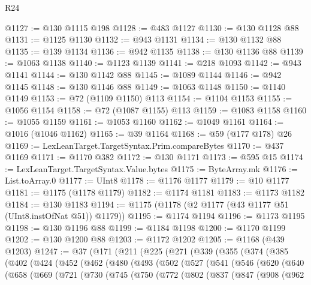 \begin{lexlean}{R24}
\begin{coremodule}
@1127 := @130 @1115 @198
@1128 := @483 @1127
@1130 := @130 @1128 @88
@1131 := @1125 @1130
@1132 := @943 @1131
@1134 := @130 @1132 @88
@1135 := @139 @1134
@1136 := @942 @1135
@1138 := @130 @1136 @88
@1139 := @1063 @1138
@1140 := @1123 @1139
@1141 := @218 @1093
@1142 := @943 @1141
@1144 := @130 @1142 @88
@1145 := @1089 @1144
@1146 := @942 @1145
@1148 := @130 @1146 @88
@1149 := @1063 @1148
@1150 := @1140 @1149
@1153 := @72 (@1109 @1150) @113
@1154 := @1104 @1153
@1155 := @1056 @1154
@1158 := @72 (@1087 @1155) @113
@1159 := @1083 @1158
@1160 := @1055 @1159
@1161 := @1053 @1160
@1162 := @1049 @1161
@1164 := @1016 (@1046 @1162)
@1165 := @39 @1164
@1168 := @59 (@177 @178) @26
@1169 := LexLeanTarget.TargetSyntax.Prim.compareBytes
@1170 := @437 @1169
@1171 := @1170 @382
@1172 := @130 @1171
@1173 := @595 @15
@1174 := LexLeanTarget.TargetSyntax.Value.bytes
@1175 := ByteArray.mk
@1176 := List.toArray.{0}
@1177 := UInt8
@1178 := @1176 @1177
@1179 := @10 @1177
@1181 := @1175 (@1178 @1179)
@1182 := @1174 @1181
@1183 := @1173 @1182
@1184 := @130 @1183
@1194 := @1175 (@1178 (@2 @1177 (@43 @1177 @51 (UInt8.instOfNat @51)) @1179))
@1195 := @1174 @1194
@1196 := @1173 @1195
@1198 := @130 @1196 @88
@1199 := @1184 @1198
@1200 := @1170 @1199
@1202 := @130 @1200 @88
@1203 := @1172 @1202
@1205 := @1168 (@439 @1203)
@1247 := @37
    (@171
      (@211
        (@225
          (@271
            (@339
              (@355
                (@374
                  (@385
                    (@402
                      (@424
                        (@452
                          (@462
                            (@480
                              (@493
                                (@502
                                  (@527
                                    (@541
                                      (@546
                                        (@620
                                          (@640
                                            (@658
                                              (@669
                                                (@721
                                                  (@730
                                                    (@745
                                                      (@750
                                                        (@772
                                                          (@802
                                                            (@837
                                                              (@847
                                                                (@908
                                                                  (@962

\end{coremodule}
\end{lexlean}
